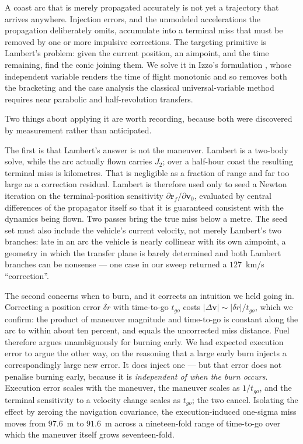 \documentclass[11pt,a4paper]{article}
\theoremstyle{definition}
\numberwithin{equation}{section}
\begin{document}
A coast arc that is merely propagated accurately is not yet a trajectory that arrives anywhere. Injection errors, and the unmodeled accelerations the propagation deliberately omits, accumulate into a terminal miss that must be removed by one or more impulsive corrections. The targeting primitive is Lambert's problem: given the current position, an aimpoint, and the time remaining, find the conic joining them. We solve it in Izzo's formulation \cite{izzo2015}, whose independent variable renders the time of flight monotonic and so removes both the bracketing and the case analysis the classical universal-variable method requires near parabolic and half-revolution transfers.

Two things about applying it are worth recording, because both were discovered by measurement rather than anticipated.

The first is that Lambert's answer is not the maneuver. Lambert is a two-body solve, while the arc actually flown carries $J_2$; over a half-hour coast the resulting terminal miss is kilometres. That is negligible as a fraction of range and far too large as a correction residual. Lambert is therefore used only to seed a Newton iteration on the terminal-position sensitivity $\partial \mathbf{r}_f / \partial \mathbf{v}_0$, evaluated by central differences of the propagator itself so that it is guaranteed consistent with the dynamics being flown. Two passes bring the true miss below a metre. The seed set must also include the vehicle's current velocity, not merely Lambert's two branches: late in an arc the vehicle is nearly collinear with its own aimpoint, a geometry in which the transfer plane is barely determined and both Lambert branches can be nonsense --- one case in our sweep returned a $127$~km/s ``correction''.

The second concerns when to burn, and it corrects an intuition we held going in. Correcting a position error $\delta r$ with time-to-go $t_{go}$ costs $|\Delta \mathbf{v}| \sim |\delta r| / t_{go}$, which we confirm: the product of maneuver magnitude and time-to-go is constant along the arc to within about ten percent, and equals the uncorrected miss distance. Fuel therefore argues unambiguously for burning early. We had expected execution error to argue the other way, on the reasoning that a large early burn injects a correspondingly large new error. It does inject one --- but that error does not penalise burning early, because it is \emph{independent of when the burn occurs}. Execution error scales with the maneuver, the maneuver scales as $1/t_{go}$, and the terminal sensitivity to a velocity change scales as $t_{go}$; the two cancel. Isolating the effect by zeroing the navigation covariance, the execution-induced one-sigma miss moves from $97.6$~m to $91.6$~m across a nineteen-fold range of time-to-go over which the maneuver itself grows seventeen-fold.
\end{document}
